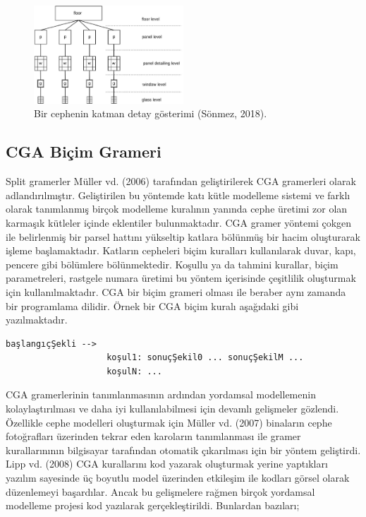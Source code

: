 \documentclass[12pt,turkish,a4paperpaper,]{report}
\begin{document}
\begin{figure}
\centering
\includegraphics[width=0.5\textwidth,height=\textheight]{source/figures/splitGrammar2.jpg}
\caption{Bir cephenin katman detay gösterimi (Sönmez, 2018).}
\end{figure}

\hypertarget{cga-biuxe7im-grameri}{%
\subsection{CGA Biçim Grameri}\label{cga-biuxe7im-grameri}}

Split gramerler Müller vd. (2006) tarafından geliştirilerek CGA
gramerleri olarak adlandırılmıştır. Geliştirilen bu yöntemde katı kütle
modelleme sistemi ve farklı olarak tanımlanmış birçok modelleme
kuralının yanında cephe üretimi zor olan karmaşık kütleler içinde
eklentiler bulunmaktadır. CGA gramer yöntemi çokgen ile belirlenmiş bir
parsel hattını yükseltip katlara bölünmüş bir hacim oluşturarak işleme
başlamaktadır. Katların cepheleri biçim kuralları kullanılarak duvar,
kapı, pencere gibi bölümlere bölünmektedir. Koşullu ya da tahmini
kurallar, biçim parametreleri, rastgele numara üretimi bu yöntem
içerisinde çeşitlilik oluşturmak için kullanılmaktadır. CGA bir biçim
grameri olması ile beraber aynı zamanda bir programlama dilidir. Örnek
bir CGA biçim kuralı aşağıdaki gibi yazılmaktadır.

\begin{verbatim}
başlangıçŞekli -->
                    koşul1: sonuçŞekil0 ... sonuçŞekilM ...
                    koşulN: ...
\end{verbatim}

CGA gramerlerinin tanımlanmasının ardından yordamsal modellemenin
kolaylaştırılması ve daha iyi kullanılabilmesi için devamlı gelişmeler
gözlendi. Özellikle cephe modelleri oluşturmak için Müller vd. (2007)
binaların cephe fotoğrafları üzerinden tekrar eden karoların
tanımlanması ile gramer kurallarınının bilgisayar tarafından otomatik
çıkarılması için bir yöntem geliştirdi. Lipp vd. (2008) CGA kurallarını
kod yazarak oluşturmak yerine yaptıkları yazılım sayesinde üç boyutlu
model üzerinden etkileşim ile kodları görsel olarak düzenlemeyi
başardılar. Ancak bu gelişmelere rağmen birçok yordamsal modelleme
projesi kod yazılarak gerçekleştirildi. Bunlardan bazıları;
\end{document}
